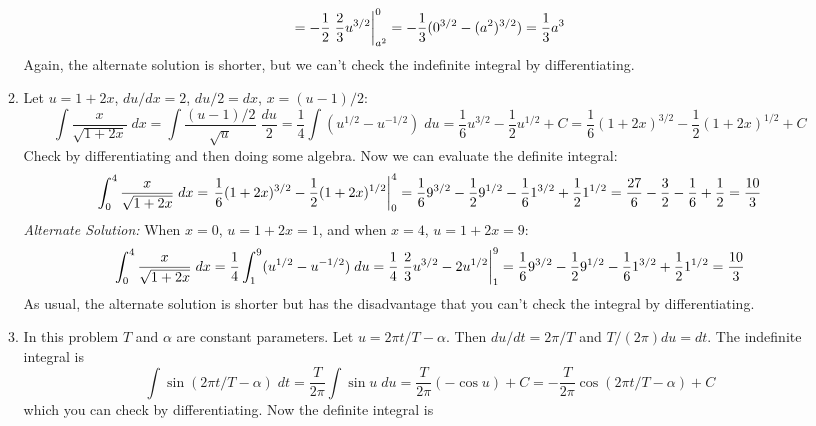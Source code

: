 \documentclass{article}
\begin{document}
\begin{enumerate}
\begin{enumerate}
\begin{equation*}
      = -\frac{1}{2} \left. \vphantom{\int} \frac{2}{3} u^{3/2}
      \right|_{a^2}^0
      = -\frac{1}{3} (0^{3/2} - (a^2)^{3/2})
      = \frac{1}{3} a^3
    \end{equation*}
    Again, the alternate solution is shorter, but we can't check the
    indefinite integral by differentiating.
  \item Let $u=1+2x$, $du/dx = 2$, $du/2=dx$, $x=(u-1)/2$:
    \begin{equation*}
      \int \frac{x}{\sqrt{1+2x}} \; dx
      = \int \frac{(u-1)/2}{\sqrt{u}} \; \frac{du}{2}
      = \frac{1}{4} \int (u^{1/2} - u^{-1/2}) \; du
      = \frac{1}{6} u^{3/2} - \frac{1}{2} u^{1/2} + C
      = \frac{1}{6} (1+2x)^{3/2} - \frac{1}{2} (1+2x)^{1/2} + C
    \end{equation*}
    Check by differentiating and then doing some algebra.
    Now we can evaluate the definite integral:
    \begin{equation*}
      \int_0^4 \frac{x}{\sqrt{1+2x}} \; dx
      = \left. \vphantom{\int} \frac{1}{6} (1+2x)^{3/2} - \frac{1}{2}
        (1+2x)^{1/2} \right|_0^4
      = \frac{1}{6} 9^{3/2} - \frac{1}{2} 9^{1/2} - \frac{1}{6}
      1^{3/2} + \frac{1}{2} 1^{1/2}
      = \frac{27}{6} - \frac{3}{2} - \frac{1}{6} + \frac{1}{2}
      = \frac{10}{3}
    \end{equation*}
    \emph{Alternate Solution:} When $x=0$, $u=1+2x=1$, and when $x=4$,
    $u=1+2x = 9$:
    \begin{equation*}
      \int_0^4 \frac{x}{\sqrt{1+2x}} \; dx
      = \frac{1}{4} \int_1^9 (u^{1/2}-u^{-1/2}) \; du
      = \frac{1}{4} \left. \vphantom{\int} \frac{2}{3} u^{3/2} - 2
        u^{1/2} \right|_1^9
      = \frac{1}{6} 9^{3/2} - \frac{1}{2} 9^{1/2}
      - \frac{1}{6} 1^{3/2} + \frac{1}{2} 1^{1/2}
      = \frac{10}{3}
    \end{equation*}
    As usual, the alternate solution is shorter but has the
    disadvantage that you can't check the integral by differentiating.
  \item In this problem $T$ and $\alpha$ are constant parameters.  Let
    $u=2\pi t/T-\alpha$.  Then $du/dt = 2\pi/T$ and $T/(2\pi) du =
    dt$.  The indefinite integral is
    \begin{equation*}
      \int \sin(2\pi t/T-\alpha) \; dt
      = \frac{T}{2\pi} \int \sin u \; du
      = \frac{T}{2\pi} (-\cos u) + C
      = -\frac{T}{2\pi} \cos (2\pi t/T - \alpha) + C
    \end{equation*}
    which you can check by differentiating.
    Now the definite integral is

\end{enumerate}
\end{enumerate}
\end{document}
